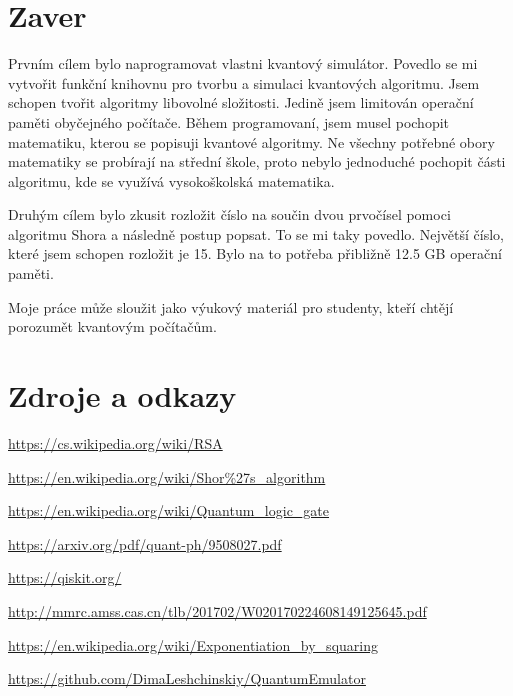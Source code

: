 \documentclass[11pt]{article}
\begin{document}
\newpage

\section{Zaver}
Prvním cílem bylo naprogramovat vlastni kvantový simulátor. Povedlo se mi vytvořit funkční knihovnu pro tvorbu a simulaci kvantových algoritmu.
Jsem schopen tvořit algoritmy libovolné složitosti.
Jedině jsem limitován operační paměti obyčejného počítače.
Během programovaní, jsem musel pochopit matematiku, kterou se popisuji kvantové algoritmy.
Ne všechny potřebné obory matematiky se probírají na střední škole,
proto nebylo jednoduché pochopit části algoritmu, kde se využívá vysokoškolská matematika.
\par Druhým cílem bylo zkusit rozložit číslo na součin dvou prvočísel pomoci algoritmu Shora a následně postup popsat.
To se mi taky povedlo.
Největší číslo, které jsem schopen rozložit je 15.
Bylo na to potřeba přibližně 12.5 GB operační paměti.
\par Moje práce může sloužit jako výukový materiál pro studenty, kteří chtějí porozumět kvantovým počítačům.
\newpage

\section{Zdroje a odkazy}
\color{blue}
\fontsize{10pt}{0}
\url{https://cs.wikipedia.org/wiki/RSA}
\par\url{https://en.wikipedia.org/wiki/Shor%27s_algorithm}
\par\url{https://en.wikipedia.org/wiki/Quantum_logic_gate}
\par\url{https://arxiv.org/pdf/quant-ph/9508027.pdf}
\par\url{https://qiskit.org/}
\par\url{http://mmrc.amss.cas.cn/tlb/201702/W020170224608149125645.pdf}
\par\url{https://en.wikipedia.org/wiki/Exponentiation_by_squaring}
\par\url{https://github.com/DimaLeshchinskiy/QuantumEmulator}
\end{document}
